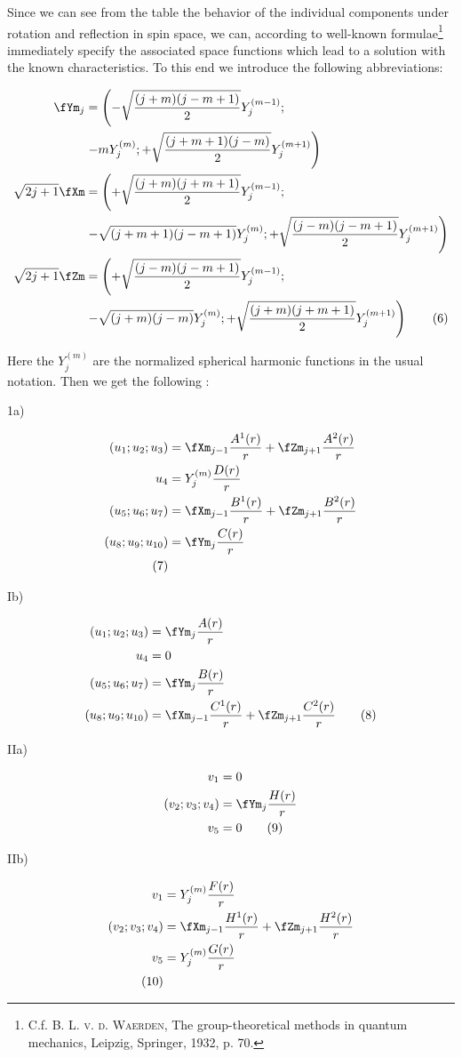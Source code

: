 \documentclass{article}
\newcommand{\nequ}[2]{
\begin{align*}
#1
\tag{#2}
\end{align*}
}
\begin{document}
Since we can see from the table the behavior of the individual components under rotation and reflection in spin space, we can, according to well-known formulae\footnote{C.f. \textsc{B. L. v. d. Waerden}, The group-theoretical methods in quantum mechanics, Leipzig, Springer, 1932, p. 70.} immediately specify the associated space functions which lead to a solution with the known characteristics. To this end we introduce the following abbreviations:
\nequ{
\fYm_j &= \left(-\sqrt{\frac{(j+m)(j-m+1)}{2}}Y^{(m-1)}_j;\right.\\
&\left. -mY^{(m)}_j; + \sqrt{\frac{(j+m+1)(j-m)}{2}}Y^{(m+1)}_j\right)\\
\sqrt{2j+1}\fXm &= \left(+\sqrt{\frac{(j+m)(j+m+1)}{2}}Y^{(m-1)}_j;\right.\\
&\left. - \sqrt{(j+m+1)(j-m+1)}Y^{(m)}_j; + 
\sqrt{\frac{(j-m)(j-m+1)}{2}}Y^{(m+1)}_j\right)\\
\sqrt{2j+1}\fZm &= \left(+\sqrt{\frac{(j-m)(j-m+1)}{2}}Y^{(m-1)}_j;\right.\\
&\left. - \sqrt{(j+m)(j-m)}Y^{(m)}_j; + 
\sqrt{\frac{(j+m)(j+m+1)}{2}}Y^{(m+1)}_j\right)
}{6}

Here the $Y^{(m)}_j$ are the normalized spherical harmonic functions in the usual notation. Then we get the following :

1a)
\nequ{
(u_1; u_2; u_3) &= \fXm_{j-1}\frac{A^1(r)}{r} + \fZm_{j+1}\frac{A^2(r)}{r}\\
u_4 &= Y^{(m)}_j\frac{D(r)}{r}\\
(u_5; u_6; u_7) &= \fXm_{j-1}\frac{B^1(r)}{r} + \fZm_{j+1}\frac{B^2(r)}{r}\\
(u_8; u_9; u_{10}) &= \fYm_j\frac{C(r)}{r}\\
}{7}

Ib)
\nequ{
(u_1; u_2; u_3) &= \fYm_j\frac{A(r)}{r}\\
u_4 &= 0\\
(u_5; u_6; u_7) &= \fYm_j\frac{B(r)}{r}\\
(u_8; u_9; u_{10}) &= \fXm_{j-1}\frac{C^1(r)}{r} + \fZm_{j+1}\frac{C^2(r)}{r}
}{8}

IIa)
\nequ{
v_1 &= 0\\
(v_2; v_3; v_4) &= \fYm_j \frac{H(r)}{r}\\
v_5 &= 0
}{9}

IIb)
\nequ{
v_1 &= Y^{(m)}_j\frac{F(r)}{r}\\
(v_2; v_3; v_4) &= \fXm_{j-1} \frac{H^1(r)}{r} + \fZm_{j+1}\frac{H^2(r)}{r}\\
v_5 &= Y^{(m)}_j\frac{G(r)}{r}\\
}{10}
\end{document}
